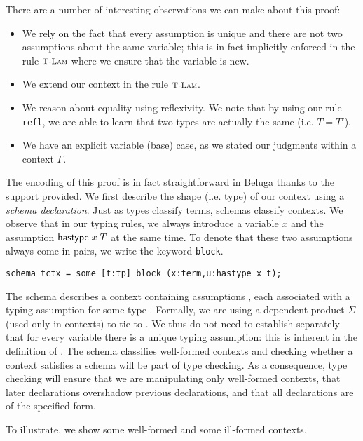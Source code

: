 There are a number of interesting observations we can make about this
proof:

\begin{itemize}
\item We rely on the fact that every assumption is unique and there
  are not two assumptions about the same variable; this is in fact
  implicitly enforced in the rule $\textsc{\footnotesize T-Lam}$ where we ensure
  that the variable is new.
\item We extend our context in the rule $\textsc{\footnotesize T-Lam}$.
\item We reason about equality using reflexivity. We note that by
  using our rule \lstinline!refl!, we are able to learn that two types
  are actually the same (i.e. $T = T'$).
\item We have an explicit variable (base) case, as we stated our judgments
  within a context $\Gamma$.
\end{itemize}


The encoding of this proof is in fact straightforward in Beluga thanks to the support provided. We
first describe the shape (i.e. type) of our context using a
\emph{schema declaration}. Just as types classify terms, schemas
classify contexts. We observe that in our typing rules, we always
introduce a variable $x$ and the assumption $\mathsf{hastype}\;x\;T$ at the same
time.
To denote that these two assumptions always come in pairs, we
write the keyword \lstinline!block!.

\begin{lstlisting}
schema tctx = some [t:tp] block (x:term,u:hastype x t);
\end{lstlisting}

The schema  describes a context containing assumptions
, each associated with a typing assumption 
for some type .  Formally, we are using a dependent product $\Sigma$
(used only in contexts) to tie  to .
We thus do not need to establish separately that for every variable there is a
unique typing assumption: this is inherent in the definition of .
The schema classifies well-formed contexts and checking whether a
context satisfies a schema will be part of type checking. As a
consequence, type checking will ensure that we are manipulating only
well-formed contexts, that later declarations overshadow previous
declarations, and that all declarations are of the specified form.

To illustrate, we show some well-formed  and some ill-formed
contexts.

